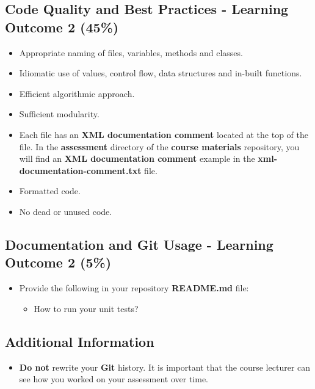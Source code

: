 \documentclass{article}
\begin{document}
\subsection*{Code Quality and Best Practices - Learning Outcome 2 (45\%)}
\begin{itemize} 
    \item Appropriate naming of files, variables, methods and classes.
    \item Idiomatic use of values, control flow, data structures and in-built functions.
    \item Efficient algorithmic approach.
    \item Sufficient modularity.
    \item Each file has an \textbf{XML documentation comment} located at the top of the file. In the \textbf{assessment} directory of the \textbf{course materials} repository, you will find an \textbf{XML documentation comment} example in the \textbf{xml-documentation-comment.txt} file.
    \item Formatted code.
    \item No dead or unused code. 
\end{itemize}

\subsection*{Documentation and Git Usage - Learning Outcome 2 (5\%)}
\begin{itemize}
    \item Provide the following in your repository \textbf{README.md} file:
    \begin{itemize}
        \item How to run your unit tests?
    \end{itemize}
\end{itemize}

\subsection*{Additional Information}
\begin{itemize}
    \item \textbf{Do not} rewrite your \textbf{Git} history. It is important that the course lecturer can see how you worked on your assessment over time.
\end{itemize}
\end{document}
